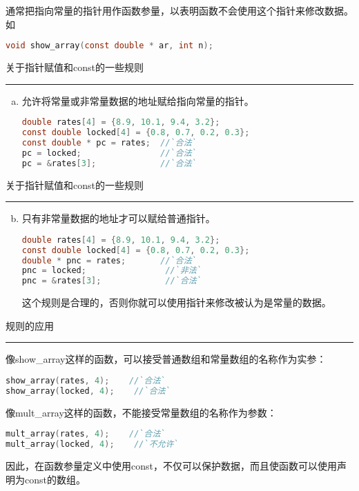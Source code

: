 \begin{frame}[fragile]
通常把指向常量的指针用作函数参量，以表明函数不会使用这个指针来修改数据。如
\begin{lstlisting}[language=c,backgroundcolor=\color{red!20}]
void show_array(const double * ar, int n);
\end{lstlisting} 
\end{frame}

\begin{frame}[fragile]
关于指针赋值和{\tf const}的一些规则
\rule{\textwidth}{0.2mm} 
\begin{enumerate}[(a)]\setcounter{enumi}{0}
\item 允许将常量或非常量数据的地址赋给指向常量的指针。
\begin{lstlisting}[language=c,backgroundcolor=\color{red!20}]
double rates[4] = {8.9, 10.1, 9.4, 3.2};
const double locked[4] = {0.8, 0.7, 0.2, 0.3};
const double * pc = rates;  //`合法`
pc = locked;                //`合法`
pc = &rates[3];             //`合法`
\end{lstlisting} 
\end{enumerate}
\end{frame}

\begin{frame}[fragile]
关于指针赋值和{\tf const}的一些规则
\rule{\textwidth}{0.2mm} 

\begin{enumerate}[(a)]\setcounter{enumi}{1}
\item 只有非常量数据的地址才可以赋给普通指针。
\begin{lstlisting}[language=c,backgroundcolor=\color{red!20}]
double rates[4] = {8.9, 10.1, 9.4, 3.2};
const double locked[4] = {0.8, 0.7, 0.2, 0.3};
double * pnc = rates;       //`合法`
pnc = locked;                //`非法`
pnc = &rates[3];             //`合法`
\end{lstlisting} 
这个规则是合理的，否则你就可以使用指针来修改被认为是常量的数据。
\end{enumerate}
\end{frame}

\begin{frame}[fragile]
规则的应用
\rule{\textwidth}{0.2mm} 
像show\_array这样的函数，可以接受普通数组和常量数组的名称作为实参：
\begin{lstlisting}[language=c,backgroundcolor=\color{red!20}]
show_array(rates, 4);    //`合法`
show_array(locked, 4);    //`合法`
\end{lstlisting} \vspace{0.1in}

像mult\_array这样的函数，不能接受常量数组的名称作为参数：
\begin{lstlisting}[language=c,backgroundcolor=\color{red!20}]
mult_array(rates, 4);    //`合法`
mult_array(locked, 4);    //`不允许`
\end{lstlisting}
\vspace{0.1in}

因此，\textcolor{acolor1}{在函数参量定义中使用{\tf const}，不仅可以保护数据，而且使函数可以使用声明为{\tf const}的数组。}
\end{frame}

